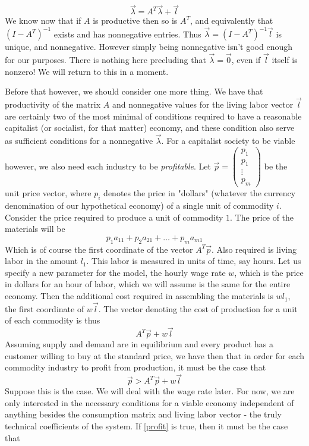  \[ \vec{\lambda} = A^T\vec{\lambda} + \vec{l} \]
 We know now that if $A$ is productive then so is $A^T$, and equivalently that $(I-A^T)^{-1}$ exists and has nonnegative entries. Thus $\vec{\lambda} = (I-A^T)^{-1}\vec{l}$ is unique, and nonnegative. However simply being nonnegative isn't good enough for our purposes. There is nothing here precluding that $\vec{\lambda} = \vec{0}$, even if $\vec{l}$ itself is nonzero! We will return to this in a moment. \par 
 Before that however, we should consider one more thing. We have that productivity of the matrix $A$ and nonnegative values for the living labor vector $\vec{l}$ are certainly two of the most minimal of conditions required to have a reasonable capitalist (or socialist, for that matter) economy, and these condition also serve as sufficient conditions for a nonnegative $\vec{\lambda}$. For a capitalist society to be viable however, we also need each industry to be \textit{profitable}. Let $\vec{p} = \begin{pmatrix} p_1 \\ p_1 \\ \vdots \\ p_m  \end{pmatrix}$ be the unit price vector, where $p_i$ denotes the price in "dollars" (whatever the currency denomination of our hypothetical economy) of a single unit of commodity $i$. Consider the price required to produce a unit of commodity $1$. The price of the materials will be
\[ p_1a_{11} + p_2a_{21} + \ldots + p_ma_{m1} \]
Which is of course the first coordinate of the vector $A^T\vec{p}$. Also required is living labor in the amount $l_1$. This labor is measured in units of time, say hours. Let us specify a new parameter for the model, the hourly wage rate $w$, which is the price in dollars for an hour of labor, which we will assume is the same for the entire economy. Then the additional cost required in assembling the materials is $wl_1$, the first coordinate of $w\vec{l}$. The vector denoting the cost of production for a unit of each commodity is thus
\[ A^T\vec{p} + w\vec{l} \]
Assuming supply and demand are in equilibrium and every product has a customer willing to buy at the standard price, we have then that in order for each commodity industry to profit from production, it must be the case that
\[ \vec{p} > A^T\vec{p} + w\vec{l} \label{profit} \]
Suppose this is the case. We will deal with the wage rate later. For now, we are only interested in the necessary conditions for a viable economy independent of anything besides the consumption matrix and living labor vector - the truly technical coefficients of the system. If \ref{profit} is true, then it must be the case that
